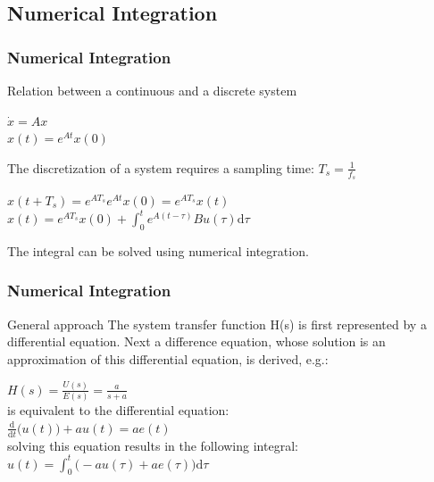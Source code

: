 \subsection{Numerical Integration}

\begin{frame}
	\frametitle{Numerical Integration}
	\begin{block}{Relation between a continuous and a discrete system}
		\begin{center}
			$\dot{x} = A x$\\
			$x(t) = e^{At} x(0)$
		\end{center}
		The discretization of a system requires a sampling time: $T_s = \frac{1}{f_s}$\\
		\begin{center}
			$x(t + T_s) = e^{AT_s} e^{At} x(0) = e^{AT_s} x(t)$
			$x(t) = e^{AT_s} x(0) + \int_0^t e^{A(t-\tau)} B u(\tau) \mathrm{d}\tau $
		\end{center}
		The integral can be solved using numerical integration.
	\end{block}
\end{frame}

\begin{frame}
	\frametitle{Numerical Integration}
	\begin{block}{General approach}
		The system transfer function H(s) is first represented by a differential equation. Next a difference equation, whose solution is an approximation of this differential equation, is derived, e.g.:\\
		\begin{center}
			$H(s) = \frac{U(s)}{E(s)} = \frac{a}{s + a}$\\
			is equivalent to the differential equation:\\
			$\frac{\mathrm d}{\mathrm d t} \big( u(t) \big) + au(t) = ae(t)$\\
			\vspace{1em}
			solving this equation results in the following integral:\\
			$u(t) = \int_0^t \big(-au(\tau) + ae(\tau) \big)\mathrm{d}\tau$
		\end{center}
	\end{block}
\end{frame}

